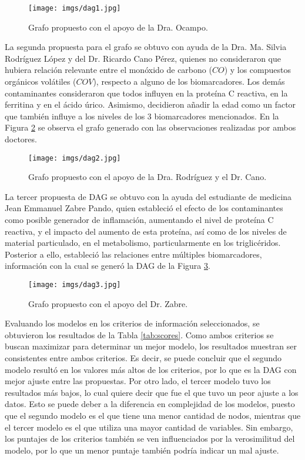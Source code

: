 \documentclass[12pt, letterpaper]{report}
\begin{document}
\begin{figure}[H]
    \centering
    \texttt{[image: imgs/dag1.jpg]}
    \caption{Grafo propuesto con el apoyo de la Dra. Ocampo.}
    \label{fig:dag1}
\end{figure}

La segunda propuesta para el grafo se obtuvo con ayuda de la Dra. Ma. Silvia Rodríguez López y del Dr. Ricardo Cano Pérez, quienes no consideraron que hubiera relación relevante entre el monóxido de carbono ($CO$) y los compuestos orgánicos volátiles ($COV$), respecto a alguno de los biomarcadores. Los demás contaminantes consideraron que todos influyen en la proteína C reactiva, en la ferritina y en el ácido úrico. Asimismo, decidieron añadir la edad como un factor que también influye a los niveles de los 3 biomarcadores mencionados. En la Figura \ref{fig:dag2} se observa el grafo generado con las observaciones realizadas por ambos doctores.

\begin{figure}[H]
    \centering
    \texttt{[image: imgs/dag2.jpg]}
    \caption{Grafo propuesto con el apoyo de la Dra. Rodríguez y el Dr. Cano.}
    \label{fig:dag2}
\end{figure}

La tercer propuesta de DAG se obtuvo con la ayuda del estudiante de medicina Jean Emmanuel Zabre Pando, quien estableció el efecto de los contaminantes como posible generador de inflamación, aumentando el nivel de proteína C reactiva, y el impacto del aumento de esta proteína, así como de los niveles de material particulado, en el metabolismo, particularmente en los triglicéridos. Posterior a ello, estableció las relaciones entre múltiples biomarcadores, información con la cual se generó la DAG de la Figura \ref{fig:dag3}.

\begin{figure}[H]
    \centering
    \texttt{[image: imgs/dag3.jpg]}
    \caption{Grafo propuesto con el apoyo del Dr. Zabre.}
    \label{fig:dag3}
\end{figure}

Evaluando los modelos en los criterios de información seleccionados, se obtuvieron los resultados de la Tabla \ref{tab:scores}. Como ambos criterios se buscan maximizar para determinar un mejor modelo, los resultados muestran ser consistentes entre ambos criterios. Es decir, se puede concluir que el segundo modelo resultó en los valores más altos de los criterios, por lo que es la DAG con mejor ajuste entre las propuestas. Por otro lado, el tercer modelo tuvo los resultados más bajos, lo cual quiere decir que fue el que tuvo un peor ajuste a los datos. Esto se puede deber a la diferencia en complejidad de los modelos, puesto que el segundo modelo es el que tiene una menor cantidad de nodos, mientras que el tercer modelo es el que utiliza una mayor cantidad de variables. Sin embargo, los puntajes de los criterios también se ven influenciados por la verosimilitud del modelo, por lo que un menor puntaje también podría indicar un mal ajuste.
\end{document}
